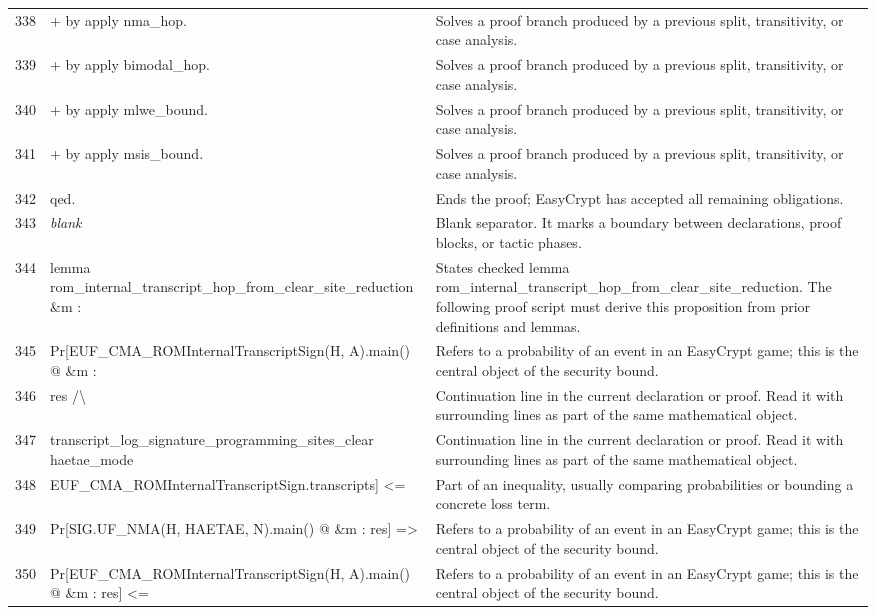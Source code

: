 \documentclass[10pt]{article}
\begin{document}
\begin{longtable}{r L{0.53\textwidth} L{0.37\textwidth}}
338 & {\ttfamily\scriptsize + by apply nma\_hop.} & Solves a proof branch produced by a previous split, transitivity, or case analysis. \\
339 & {\ttfamily\scriptsize + by apply bimodal\_hop.} & Solves a proof branch produced by a previous split, transitivity, or case analysis. \\
340 & {\ttfamily\scriptsize + by apply mlwe\_bound.} & Solves a proof branch produced by a previous split, transitivity, or case analysis. \\
341 & {\ttfamily\scriptsize + by apply msis\_bound.} & Solves a proof branch produced by a previous split, transitivity, or case analysis. \\
342 & {\ttfamily\scriptsize qed.} & Ends the proof; EasyCrypt has accepted all remaining obligations. \\
343 & {\ttfamily\scriptsize \emph{blank}} & Blank separator.  It marks a boundary between declarations, proof blocks, or tactic phases. \\
344 & {\ttfamily\scriptsize lemma rom\_internal\_transcript\_hop\_from\_clear\_site\_reduction \&m :} & States checked lemma rom\_internal\_transcript\_hop\_from\_clear\_site\_reduction.  The following proof script must derive this proposition from prior definitions and lemmas. \\
345 & {\ttfamily\scriptsize   Pr[EUF\_CMA\_ROMInternalTranscriptSign(H, A).main() @ \&m :} & Refers to a probability of an event in an EasyCrypt game; this is the central object of the security bound. \\
346 & {\ttfamily\scriptsize       res /\textbackslash{}} & Continuation line in the current declaration or proof.  Read it with surrounding lines as part of the same mathematical object. \\
347 & {\ttfamily\scriptsize       transcript\_log\_signature\_programming\_sites\_clear haetae\_mode} & Continuation line in the current declaration or proof.  Read it with surrounding lines as part of the same mathematical object. \\
348 & {\ttfamily\scriptsize         EUF\_CMA\_ROMInternalTranscriptSign.transcripts] <=} & Part of an inequality, usually comparing probabilities or bounding a concrete loss term. \\
349 & {\ttfamily\scriptsize     Pr[SIG.UF\_NMA(H, HAETAE, N).main() @ \&m : res] =>} & Refers to a probability of an event in an EasyCrypt game; this is the central object of the security bound. \\
350 & {\ttfamily\scriptsize   Pr[EUF\_CMA\_ROMInternalTranscriptSign(H, A).main() @ \&m : res] <=} & Refers to a probability of an event in an EasyCrypt game; this is the central object of the security bound. \\

\end{longtable}
\end{document}
